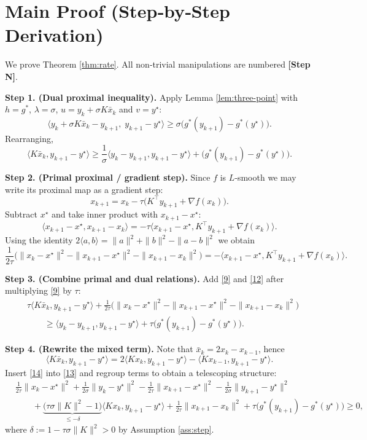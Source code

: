 \documentclass{article}
\begin{document}
\section*{Main Proof (Step‑by‑Step Derivation)}
We prove Theorem \ref{thm:rate}. All non‑trivial manipulations are numbered \textbf{[Step N]}.

\medskip
\noindent\textbf{Step 1. (Dual proximal inequality).}  
Apply Lemma \ref{lem:three-point} with $h=g^{*}$, $\lambda=\sigma$, $u=y_{k}+\sigma K\bar{x}_{k}$ and $v=y^{\star}$:
\[
\langle y_{k}+\sigma K\bar{x}_{k}-y_{k+1},\; y_{k+1}-y^{\star}\rangle
\ge
\sigma\bigl(g^{*}(y_{k+1})-g^{*}(y^{\star})\bigr).
\tag{8}
\]
Rearranging,
\[
\langle K\bar{x}_{k},y_{k+1}-y^{\star}\rangle
\ge
\frac{1}{\sigma}\langle y_{k}-y_{k+1},y_{k+1}-y^{\star}\rangle
+\bigl(g^{*}(y_{k+1})-g^{*}(y^{\star})\bigr).
\tag{9}
\]

\noindent\textbf{Step 2. (Primal proximal / gradient step).}  
Since $f$ is $L$‑smooth we may write its proximal map as a gradient step:
\[
x_{k+1}=x_{k}-\tau\bigl(K^{\top}y_{k+1}+\nabla f(x_{k})\bigr).
\tag{10}
\]
Subtract $x^{\star}$ and take inner product with $x_{k+1}-x^{\star}$:
\[
\langle x_{k+1}-x^{\star},x_{k+1}-x_{k}\rangle
=-\tau\langle x_{k+1}-x^{\star},K^{\top}y_{k+1}+\nabla f(x_{k})\rangle .
\tag{11}
\]
Using the identity $2\langle a,b\rangle=\|a\|^{2}+\|b\|^{2}-\|a-b\|^{2}$ we obtain
\[
\frac{1}{2\tau}\bigl(\|x_{k}-x^{\star}\|^{2}-\|x_{k+1}-x^{\star}\|^{2}
-\|x_{k+1}-x_{k}\|^{2}\bigr)
=
-\langle x_{k+1}-x^{\star},K^{\top}y_{k+1}+\nabla f(x_{k})\rangle .
\tag{12}
\]

\noindent\textbf{Step 3. (Combine primal and dual relations).}  
Add \eqref{9} and \eqref{12} after multiplying \eqref{9} by $\tau$:
\[
\begin{aligned}
&\tau\langle K\bar{x}_{k},y_{k+1}-y^{\star}\rangle
+\frac{1}{2\tau}\bigl(\|x_{k}-x^{\star}\|^{2}-\|x_{k+1}-x^{\star}\|^{2}
-\|x_{k+1}-x_{k}\|^{2}\bigr)\\
&\qquad\ge
\langle y_{k}-y_{k+1},y_{k+1}-y^{\star}\rangle
+\tau\bigl(g^{*}(y_{k+1})-g^{*}(y^{\star})\bigr).
\end{aligned}
\tag{13}
\]

\noindent\textbf{Step 4. (Rewrite the mixed term).}  
Note that $\bar{x}_{k}=2x_{k}-x_{k-1}$, hence
\[
\langle K\bar{x}_{k},y_{k+1}-y^{\star}\rangle
=2\langle Kx_{k},y_{k+1}-y^{\star}\rangle-\langle Kx_{k-1},y_{k+1}-y^{\star}\rangle.
\tag{14}
\]
Insert \eqref{14} into \eqref{13} and regroup terms to obtain a telescoping structure:
\[
\begin{aligned}
&\frac{1}{2\tau}\|x_{k}-x^{\star}\|^{2}
+\frac{1}{2\sigma}\|y_{k}-y^{\star}\|^{2}
-\frac{1}{2\tau}\|x_{k+1}-x^{\star}\|^{2}
-\frac{1}{2\sigma}\|y_{k+1}-y^{\star}\|^{2}\\
&\qquad
+\underbrace{\bigl(\tau\sigma\|K\|^{2}-1\bigr)}_{\displaystyle\le -\delta}
\langle Kx_{k},y_{k+1}-y^{\star}\rangle
+\frac{1}{2\tau}\|x_{k+1}-x_{k}\|^{2}
+\tau\bigl(g^{*}(y_{k+1})-g^{*}(y^{\star})\bigr)\ge0,
\end{aligned}
\tag{15}
\]
where $\delta:=1-\tau\sigma\|K\|^{2}>0$ by Assumption \ref{ass:step}.
\end{document}
